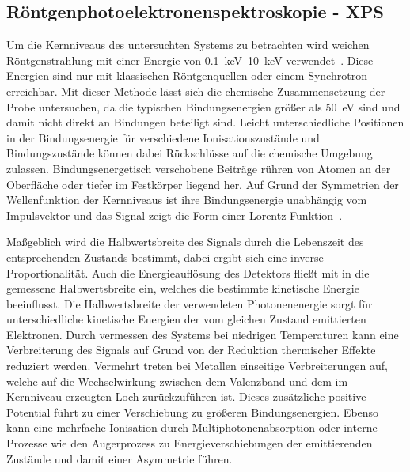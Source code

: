         \subsection{Röntgenphotoelektronenspektroskopie - XPS} \label{sec:XPS}
            Um die Kernniveaus des untersuchten Systems zu betrachten wird weichen Röntgenstrahlung mit einer Energie von \SIrange{0.1}{10}{\kilo\electronvolt} verwendet~\cite{Fauster}.
            Diese Energien sind nur mit klassischen Röntgenquellen oder einem Synchrotron erreichbar.
            Mit dieser Methode lässt sich die chemische Zusammensetzung der Probe untersuchen, da die typischen Bindungsenergien größer als \SI{50}{\electronvolt} sind und damit nicht direkt an Bindungen beteiligt sind.
            Leicht unterschiedliche Positionen in der Bindungsenergie für verschiedene Ionisationszustände und Bindungszustände können dabei Rückschlüsse auf die chemische Umgebung zulassen.
            Bindungsenergetisch verschobene Beiträge rühren von Atomen an der Oberfläche oder tiefer im Festkörper liegend her.
            Auf Grund der Symmetrien der Wellenfunktion der Kernniveaus ist ihre Bindungsenergie unabhängig vom Impulsvektor und das Signal zeigt die Form einer Lorentz-Funktion~\cite{Hüfner}.

            Maßgeblich wird die Halbwertsbreite des Signals durch die Lebenszeit des entsprechenden Zustands bestimmt, dabei ergibt sich eine inverse Proportionalität.
            Auch die Energieauflösung des Detektors fließt mit in die gemessene Halbwertsbreite ein, welches die bestimmte kinetische Energie beeinflusst.
            Die Halbwertsbreite der verwendeten Photonenenergie sorgt für unterschiedliche kinetische Energien der vom gleichen Zustand emittierten Elektronen.
            Durch vermessen des Systems bei niedrigen Temperaturen kann eine Verbreiterung des Signals auf Grund von der Reduktion thermischer Effekte reduziert werden.
            Vermehrt treten bei Metallen einseitige Verbreiterungen auf, welche auf die Wechselwirkung zwischen dem Valenzband und dem im Kernniveau erzeugten Loch zurückzuführen ist.
            Dieses zusätzliche positive Potential führt zu einer Verschiebung zu größeren Bindungsenergien.
            Ebenso kann eine mehrfache Ionisation durch Multiphotonenabsorption oder interne Prozesse wie den Augerprozess zu Energieverschiebungen der emittierenden Zustände und damit einer Asymmetrie führen.

